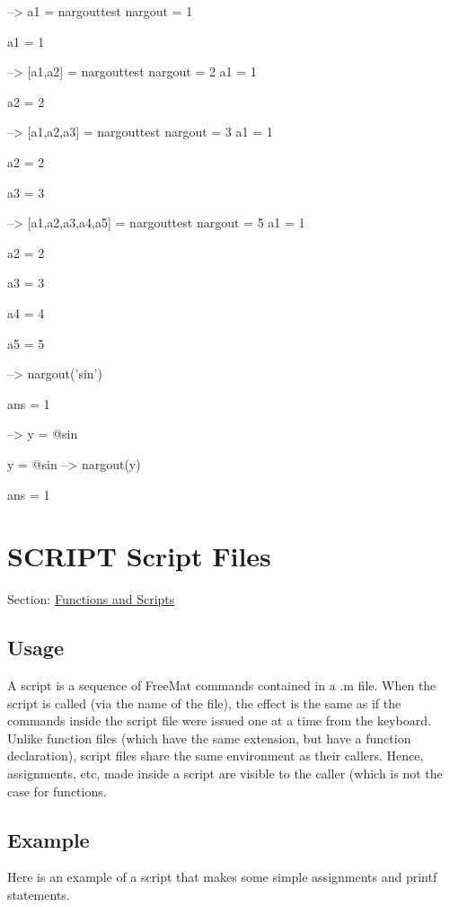 \begin{DoxyVerbInclude}
--> a1 = nargouttest
nargout = 1

a1 = 
 1 

--> [a1,a2] = nargouttest
nargout = 2
a1 = 
 1 

a2 = 
 2 

--> [a1,a2,a3] = nargouttest
nargout = 3
a1 = 
 1 

a2 = 
 2 

a3 = 
 3 

--> [a1,a2,a3,a4,a5] = nargouttest
nargout = 5
a1 = 
 1 

a2 = 
 2 

a3 = 
 3 

a4 = 
 4 

a5 = 
 5 

--> nargout('sin')

ans = 
 1 

--> y = @sin

y = 
 @sin
--> nargout(y)

ans = 
 1 
\end{DoxyVerbInclude}
 \hypertarget{functions_script}{}\section{S\-C\-R\-I\-P\-T Script Files}\label{functions_script}
Section\-: \hyperlink{sec_functions}{Functions and Scripts} \hypertarget{vtkwidgets_vtkxyplotwidget_Usage}{}\subsection{Usage}\label{vtkwidgets_vtkxyplotwidget_Usage}
A script is a sequence of Free\-Mat commands contained in a {\ttfamily .m} file. When the script is called (via the name of the file), the effect is the same as if the commands inside the script file were issued one at a time from the keyboard. Unlike {\ttfamily function} files (which have the same extension, but have a {\ttfamily function} declaration), script files share the same environment as their callers. Hence, assignments, etc, made inside a script are visible to the caller (which is not the case for functions. \hypertarget{variables_struct_Example}{}\subsection{Example}\label{variables_struct_Example}
Here is an example of a script that makes some simple assignments and {\ttfamily printf} statements.

